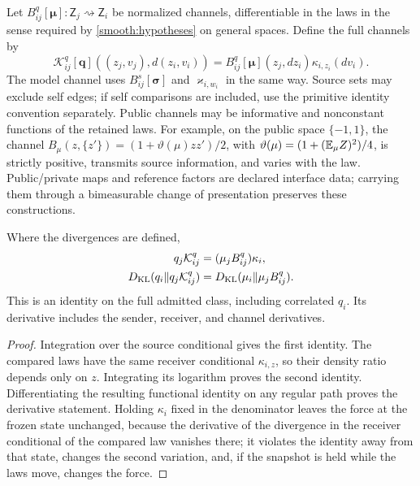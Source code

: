 Let $B_{ij}^q[\boldsymbol\mu]:\mathsf Z_j\rightsquigarrow\mathsf Z_i$ be normalized channels, differentiable in the laws in the sense required by \cref{smooth:hypotheses} on general spaces. Define the full channels by
\begin{equation}
 \mathcal K_{ij}^q[\mathbf q]((z_j,v_j),d(z_i,v_i))
 =B_{ij}^q[\boldsymbol\mu](z_j,dz_i)\kappa_{i,z_i}(dv_i).
 \label{smooth:shield}
\end{equation}
The model channel uses $B_{ij}^s[\boldsymbol\sigma]$ and $\varkappa_{i,w_i}$ in the same way. Source sets may exclude self edges; if self comparisons are included, use the primitive identity convention separately. Public channels may be informative and nonconstant functions of the retained laws. For example, on the public space $\{-1,1\}$, the channel $B_\mu(z,\{z'\})=(1+\vartheta(\mu)zz')/2$, with $\vartheta(\mu)=(1+(\mathbb E_\mu Z)^2)/4$, is strictly positive, transmits source information, and varies with the law. Public/private maps and reference factors are declared interface data; carrying them through a bimeasurable change of presentation preserves these constructions.

Where the divergences are defined,
\begin{equation}
 \begin{aligned}
 q_j\mathcal K_{ij}^q&=(\mu_jB_{ij}^q)\kappa_i,\\
 D_{\mathrm{KL}}(q_i\Vert q_j\mathcal K_{ij}^q)
 &=D_{\mathrm{KL}}(\mu_i\Vert\mu_jB_{ij}^q).
 \end{aligned}
 \label{smooth:peer-cancellation}
\end{equation}
This is an identity on the full admitted class, including correlated $q_i$. Its derivative includes the sender, receiver, and channel derivatives.
\begin{proof}
Integration over the source conditional gives the first identity. The compared laws have the same receiver conditional $\kappa_{i,z}$, so their density ratio depends only on $z$. Integrating its logarithm proves the second identity. Differentiating the resulting functional identity on any regular path proves the derivative statement. Holding $\kappa_i$ fixed in the denominator leaves the force at the frozen state unchanged, because the derivative of the divergence in the receiver conditional of the compared law vanishes there; it violates the identity away from that state, changes the second variation, and, if the snapshot is held while the laws move, changes the force.
\end{proof}

